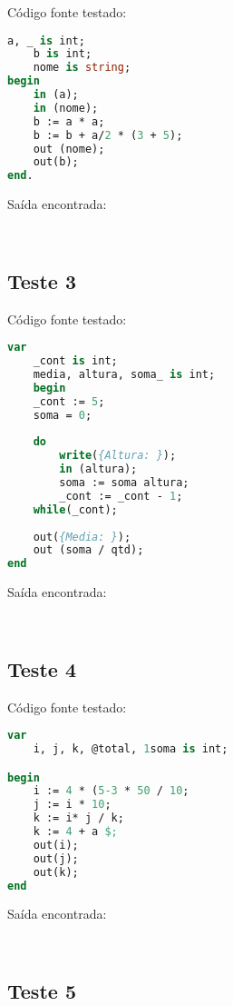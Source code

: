 \documentclass[11pt]{article}
\begin{document}
Código fonte testado:
\begin{lstlisting}[language=Pascal]
	a, _ is int;
	b is int;
	nome is string;
begin
	in (a);
	in (nome);
	b := a * a;
	b := b + a/2 * (3 + 5);
	out (nome);
	out(b);
end.
\end{lstlisting}
	
Saída encontrada:
\begin{verbatim}
	
\end{verbatim}



\subsection{Teste 3}

Código fonte testado:
\begin{lstlisting}[language=Pascal]
var
	_cont is int;
	media, altura, soma_ is int;
	begin
	_cont := 5;
	soma = 0;
	
	do
		write({Altura: });
		in (altura);
		soma := soma altura;
		_cont := _cont - 1;
	while(_cont);
	
	out({Media: });
	out (soma / qtd);
end
\end{lstlisting}
	
Saída encontrada:
\begin{verbatim}
	
\end{verbatim}




\subsection{Teste 4}

Código fonte testado:
\begin{lstlisting}[language=Pascal]
var
	i, j, k, @total, 1soma is int;

begin
	i := 4 * (5-3 * 50 / 10;
	j := i * 10;
	k := i* j / k;
	k := 4 + a $;
	out(i);
	out(j);
	out(k);
end
\end{lstlisting}
	
Saída encontrada:
\begin{verbatim}
	
\end{verbatim}



	
\subsection{Teste 5}
\end{document}
